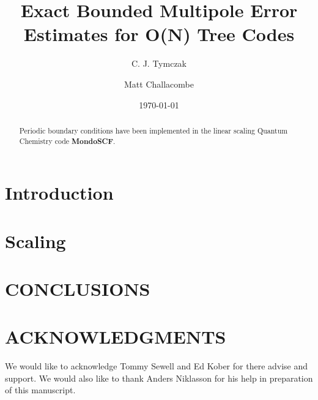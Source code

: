 \documentclass[prb,aps,nobibnotes,superbib,preprint]{revtex4}
\begin{document}
\title{\textbf{Exact Bounded Multipole Error Estimates for O(N) Tree Codes}}

\author{C. J. Tymczak}
\author{Matt Challacombe}


\date{\today}

\begin{abstract}
Periodic boundary conditions have been implemented in the linear scaling
Quantum Chemistry code \textbf{MondoSCF}.
\end{abstract}


\maketitle

\section{Introduction}

\section{Scaling}


\section{CONCLUSIONS}


\section*{ACKNOWLEDGMENTS}

We would like to acknowledge Tommy Sewell and Ed Kober for there advise
and support. We would also like to thank Anders Niklasson for his help
in preparation of this manuscript. 

 



\appendix
\end{document}
